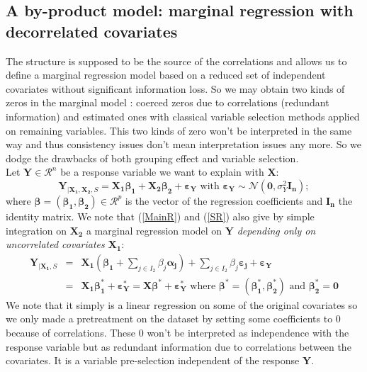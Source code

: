 \documentclass[11pt,a4paper]{article}
\begin{document}


	
\subsection{A by-product model: marginal regression with decorrelated covariates}
 The structure is supposed to be the source of the correlations and allows us to define a marginal regression model based on a reduced set of independent covariates without significant information loss. So we may obtain two kinds of zeros in the marginal model : coerced zeros due to correlations (redundant information) and estimated ones with classical variable selection methods applied on remaining variables. This two kinds of zero won't be interpreted in the same way and thus consistency issues don't mean interpretation issues any more. So we dodge the drawbacks of both grouping effect and variable selection.
 	\\
Let $\boldsymbol{Y} \in \mathcal{R}^n$ be a response variable we want to explain with $\boldsymbol{X}$:
	\begin{equation}
			\boldsymbol{Y}_{|\boldsymbol{X_1},\boldsymbol{X_2},S}=\boldsymbol{X_1\beta_1}+\boldsymbol{X_2\beta_2}+\boldsymbol{\varepsilon_Y} \textrm{ with } \boldsymbol{\varepsilon_Y} \sim \mathcal{N}(\boldsymbol{0},\sigma^2_Y\boldsymbol{I_n});	\label{MainR}
		\end{equation}
		where $\boldsymbol{\beta}=(\boldsymbol{\beta_1},\boldsymbol{\beta_2}) \in  \mathcal{R}^p$ is the vector of the regression coefficients and $\boldsymbol{I_n}$ the identity matrix. 
We note that (\ref{MainR}) and (\ref{SR}) also give by simple integration on $\boldsymbol{X_2}$ a marginal regression model on $\boldsymbol{Y}$ {\it depending only on uncorrelated covariates $\boldsymbol{X_1}$}:
\begin{eqnarray}
	\boldsymbol{Y}_{|\boldsymbol{X_1},S}&=&\boldsymbol{X_1} (\boldsymbol{\beta_{1}}+ \sum_{j \in I_2}\beta_{j}\boldsymbol{\alpha_j})+  \sum_{j \in I_2}\beta_{j}\boldsymbol{\varepsilon_{j}}+\boldsymbol{\varepsilon_Y} \label{Trueexpl} \\
	&=&\boldsymbol{X_1}\boldsymbol{\beta_1^*}+\boldsymbol{\varepsilon_Y^*}=\boldsymbol{X}\boldsymbol{\beta^*}+\boldsymbol{\varepsilon_Y^*} \textrm{ where }\boldsymbol{\beta^*}=(\boldsymbol{\beta_1^*},\boldsymbol{\beta_2^*}) \textrm{ and } \boldsymbol{\beta_2^*}=\boldsymbol{0}
\end{eqnarray}
We note that it simply is a linear regression on some of the original covariates so we only made a pretreatment on the dataset by setting some coefficients to $0$ because of correlations. These $0$ won't be interpreted as independence with the response variable but as redundant information due to correlations between the covariates. It is a variable pre-selection independent of the response $\boldsymbol{Y}$. 
\end{document}
